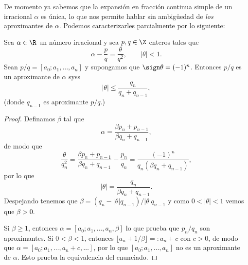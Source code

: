 \documentclass[teoria-numeros.tex]{subfiles}
\begin{document}
De momento ya sabemos que la expansión en fracción continua simple de un irracional $\alpha$ es única, lo que nos permite hablar sin ambigüedad de \textit{los}
aproximantes de $\alpha$.
Podemos caracterizarles parcialmente por lo siguiente:
\begin{thmi}
	Sea $\alpha \in \R$ un número irracional y sea $p, q \in \Z$ enteros tales que
	$$ \alpha - \frac{p}{q} = \frac{\theta}{q^2}, \qquad |\theta| < 1. $$
	Sean $p/q = [a_0; a_1, \dots, a_n]$ y supongamos que $\sign\theta = (-1)^n$.
	Entonces $p/q$ es un aproximante de $\alpha$ syss
	$$ |\theta| \le \frac{q_n}{q_n + q_{n-1}}, $$
	(donde $q_{n-1}$ es aproximante $p/q$.)
\end{thmi}
\begin{proof}
	Definamos $\beta$ tal que
	$$ \alpha = \frac{\beta p_n + p_{n-1}}{\beta q_n + q_{n-1}}, $$
	de modo que
	$$ \frac{\theta}{q_n^2} = \frac{\beta p_n + p_{n-1}}{\beta q_n + q_{n-1}} - \frac{p_n}{q_n} = \frac{(-1)^n}{q_n(\beta q_n + q_{n-1})}, $$
	por lo que
	$$ |\theta| = \frac{q_n}{\beta q_n + q_{n-1}}. $$
	Despejando tenemos que $\beta = (q_n - |\theta| q_{n-1})/|\theta| q_{n-1}$ y como $0 < |\theta| < 1$ vemos que $\beta > 0$.

	Si $\beta \ge 1$, entonces $\alpha = [a_0; a_1, \dots, a_n, \beta]$ lo que prueba que $p_n/q_n$ son aproximantes.
	Si $0 < \beta < 1$, entonces $\lfloor a_n + 1/\beta \rfloor =: a_n + c$ con $c > 0$, de modo que $\alpha = [a_0; a_1, \dots, a_n + c, \dots]$,
	por lo que $[a_0; a_1, \dots, a_n]$ no es un aproximante de $\alpha$.
	Esto prueba la equivalencia del enunciado.
\end{proof}
\end{document}

